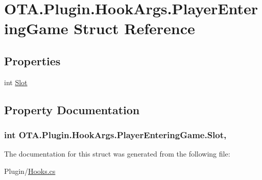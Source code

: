 \hypertarget{struct_o_t_a_1_1_plugin_1_1_hook_args_1_1_player_entering_game}{}\section{O\+T\+A.\+Plugin.\+Hook\+Args.\+Player\+Entering\+Game Struct Reference}
\label{struct_o_t_a_1_1_plugin_1_1_hook_args_1_1_player_entering_game}
\subsection*{Properties}
\begin{DoxyCompactItemize}
\item 
int \hyperlink{struct_o_t_a_1_1_plugin_1_1_hook_args_1_1_player_entering_game_a272503aef12e48243a0b0abc2fd117a4}{Slot}
\end{DoxyCompactItemize}


\subsection{Property Documentation}
\hypertarget{struct_o_t_a_1_1_plugin_1_1_hook_args_1_1_player_entering_game_a272503aef12e48243a0b0abc2fd117a4}{}
\subsubsection[{Slot}]{\setlength{\rightskip}{0pt plus 5cm}int O\+T\+A.\+Plugin.\+Hook\+Args.\+Player\+Entering\+Game.\+Slot\hspace{0.3cm}{\ttfamily [get]}, {\ttfamily [set]}}\label{struct_o_t_a_1_1_plugin_1_1_hook_args_1_1_player_entering_game_a272503aef12e48243a0b0abc2fd117a4}


The documentation for this struct was generated from the following file\+:\begin{DoxyCompactItemize}
\item 
Plugin/\hyperlink{_hooks_8cs}{Hooks.\+cs}\end{DoxyCompactItemize}
